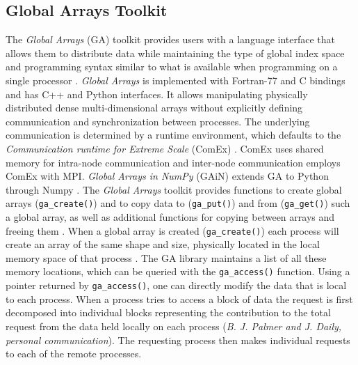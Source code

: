 \subsection{Global Arrays Toolkit}
\label{sec:methods-ga}

The \emph{Global Arrays} (GA) toolkit provides users with a language interface that allows them to distribute data while maintaining the type of global index space and programming syntax similar to what is available when programming on a single processor \cite{GA}.
\emph{Global Arrays} is implemented with Fortran-77 and C bindings and has C++ and Python interfaces.
It allows manipulating physically distributed dense multi-dimensional arrays without explicitly defining communication and synchronization between processes.
The underlying communication is determined by a runtime environment, which defaults to the \emph{Communication runtime for Extreme Scale} (ComEx) \cite{Daily:2014aa}.
ComEx uses shared memory for intra-node communication and inter-node communication employs ComEx with MPI.
\emph{Global Arrays in NumPy} (GAiN) extends GA to Python through Numpy \cite{GAiN}. 
The \emph{Global Arrays} toolkit provides functions to create global arrays (\texttt{ga\_create()}) and to copy data to (\texttt{ga\_put()}) and from (\texttt{ga\_get()}) such a global array,  as well as additional functions for copying between arrays and freeing them \cite{GAiN}.
When a global array is created (\texttt{ga\_create()}) each process will create an array of the same shape and size, physically located in the local memory space of that process \cite{GA}. 
The GA library maintains a list of all these memory locations, which can be queried with the \texttt{ga\_access()} function.
Using a pointer returned by \texttt{ga\_access()}, one can directly modify the data that is local to each process.
When a process tries to access a block of data the request is first decomposed into individual blocks representing the contribution to the total request from the data held locally on each process (\textit{B. J. Palmer and J. Daily, personal communication}).
The requesting process then makes individual requests to each of the remote processes. 

